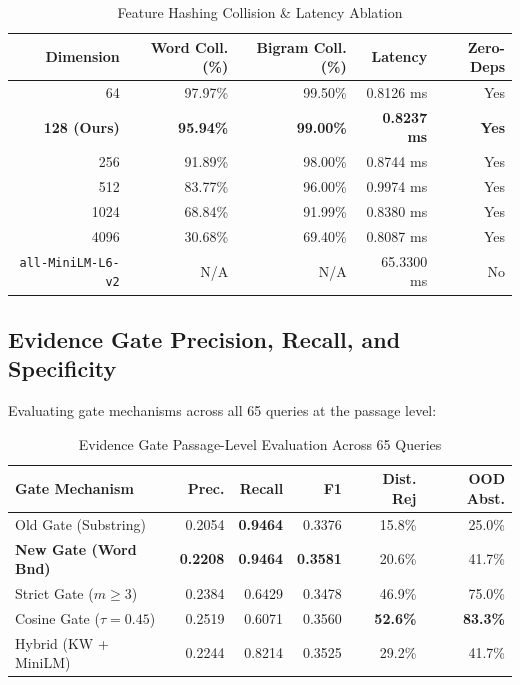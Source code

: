 \documentclass[conference]{IEEEtran}
\begin{document}
\begin{table}[htbp]
\caption{Feature Hashing Collision \& Latency Ablation}
\begin{center}
\begin{tabular}{rrrrr}
\toprule
\textbf{Dimension} & \textbf{Word Coll. (\%)} & \textbf{Bigram Coll. (\%)} & \textbf{Latency} & \textbf{Zero-Deps} \\
\midrule
64 & 97.97\% & 99.50\% & 0.8126 ms & Yes \\
\textbf{128 (Ours)} & \textbf{95.94\%} & \textbf{99.00\%} & \textbf{0.8237 ms} & \textbf{Yes} \\
256 & 91.89\% & 98.00\% & 0.8744 ms & Yes \\
512 & 83.77\% & 96.00\% & 0.9974 ms & Yes \\
1024 & 68.84\% & 91.99\% & 0.8380 ms & Yes \\
4096 & 30.68\% & 69.40\% & 0.8087 ms & Yes \\
\texttt{all-MiniLM-L6-v2} & N/A & N/A & 65.3300 ms & No \\
\bottomrule
\end{tabular}
\end{center}
\end{table}

\subsection{Evidence Gate Precision, Recall, and Specificity}
Evaluating gate mechanisms across all 65 queries at the passage level:

\begin{table}[htbp]
\caption{Evidence Gate Passage-Level Evaluation Across 65 Queries}
\begin{center}
\begin{tabular}{lrrrrr}
\toprule
\textbf{Gate Mechanism} & \textbf{Prec.} & \textbf{Recall} & \textbf{F1} & \textbf{Dist. Rej} & \textbf{OOD Abst.} \\
\midrule
Old Gate (Substring) & 0.2054 & \textbf{0.9464} & 0.3376 & 15.8\% & 25.0\% \\
\textbf{New Gate (Word Bnd)} & \textbf{0.2208} & \textbf{0.9464} & \textbf{0.3581} & 20.6\% & 41.7\% \\
Strict Gate ($m \ge 3$) & 0.2384 & 0.6429 & 0.3478 & 46.9\% & 75.0\% \\
Cosine Gate ($\tau = 0.45$) & 0.2519 & 0.6071 & 0.3560 & \textbf{52.6\%} & \textbf{83.3\%} \\
Hybrid (KW + MiniLM) & 0.2244 & 0.8214 & 0.3525 & 29.2\% & 41.7\% \\
\bottomrule
\end{tabular}
\end{center}
\end{table}
\end{document}
